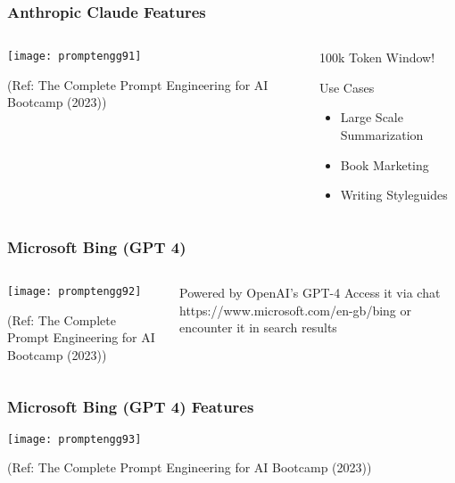 \begin{frame}[fragile]\frametitle{Anthropic Claude Features}


\begin{columns}
    \begin{column}[T]{0.6\linewidth}
		\begin{center}
		\texttt{[image: promptengg91]}

		{\tiny (Ref: The Complete Prompt Engineering for AI Bootcamp (2023))}
		\end{center}	
    \end{column}
    \begin{column}[T]{0.4\linewidth}
		100k Token Window! 
		
		Use Cases

		\begin{itemize}
		\item Large Scale Summarization
		\item Book Marketing
		\item Writing Styleguides
		\end{itemize}	 
    \end{column}
  \end{columns}
\end{frame}

\begin{frame}[fragile]\frametitle{Microsoft Bing (GPT 4)}


\begin{columns}
    \begin{column}[T]{0.6\linewidth}
		\begin{center}
		\texttt{[image: promptengg92]}

		{\tiny (Ref: The Complete Prompt Engineering for AI Bootcamp (2023))}
		\end{center}	
    \end{column}
    \begin{column}[T]{0.4\linewidth}
		Powered by OpenAI’s GPT-4
		Access it via chat https://www.microsoft.com/en-gb/bing or encounter it in search results
    \end{column}
  \end{columns}
\end{frame}


\begin{frame}[fragile]\frametitle{Microsoft Bing (GPT 4) Features}


		\begin{center}
		\texttt{[image: promptengg93]}

		{\tiny (Ref: The Complete Prompt Engineering for AI Bootcamp (2023))}
		\end{center}	

\end{frame}

